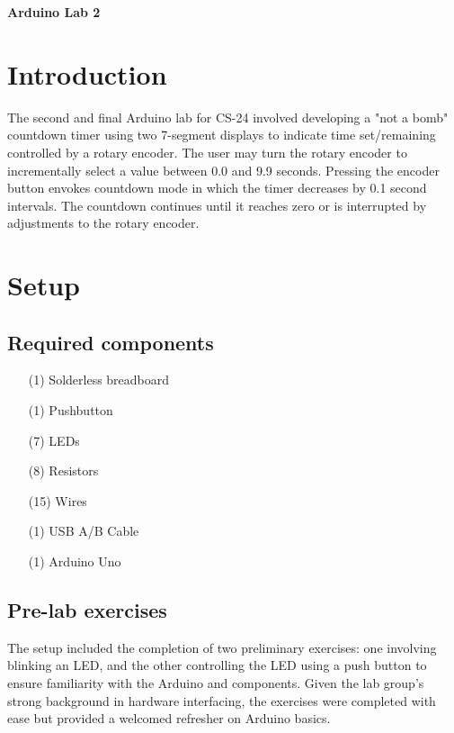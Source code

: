 \documentclass[fleqn]{article}
\begin{document}
\pagestyle{fancy}
\fancyhead{}
\fancyhead[R]{\thepage}
\fancyfoot{}

\begin{center}
    \Large{\textbf{Arduino Lab 2}}\\
\end{center}
\vspace{0.25in}

\section{Introduction}
The second and final Arduino lab for CS-24 involved developing a "not a bomb" countdown timer using two 7-segment displays to indicate time set/remaining controlled by a rotary encoder. The user may turn the rotary encoder to incrementally select a value between 0.0 and 9.9 seconds. Pressing the encoder button envokes countdown mode in which the timer decreases by 0.1 second intervals. The countdown continues until it reaches zero or is interrupted by adjustments to the rotary encoder. 
\section{Setup}
\subsection{Required components}
\begin{itemize}
    \item[(1)] Solderless breadboard
    \item[(1)] Pushbutton
    \item[(7)] LEDs
    \item[(8)] Resistors
    \item[(15)] Wires
    \item[(1)] USB A/B Cable
    \item[(1)] Arduino Uno
\end{itemize}
\subsection{Pre-lab exercises}
The setup included the completion of two preliminary exercises: one involving blinking an LED, and the other controlling the LED using a push button to ensure familiarity with the Arduino and components. Given the lab group’s strong background in hardware interfacing, the exercises were completed with ease but provided a welcomed refresher on Arduino basics. 
\end{document}

